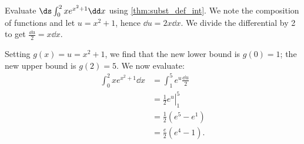 \begin{example}\label{ex_subst_def_3}
Evaluate $\ds\int_0^2 xe^{x^2+1}\dd x$ using \autoref{thm:subst_def_int}.
\solution
We note the composition of functions and let $u=x^2+1$, hence $\dd u=2x\dd x$. We divide the differential by 2 to get $\frac{\dd u}2=x\dd x$.

Setting $g(x)=u=x^2+1$, we find that the new lower bound is $g(0)=1$; the new upper bound is $g(2)=5$. We now evaluate:
\begin{align*}
	\int_0^2 xe^{x^2+1}\dd x
	&= \int_1^5 e^u \frac{\dd u}2\\
	&= \left.\frac12 e^u\right|_1^5\\
	&= \frac12(e^5-e^1) \\
	&= \frac e2(e^4-1). %
\end{align*}
\end{example}



